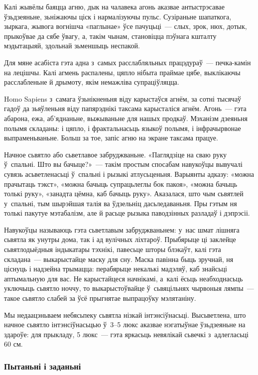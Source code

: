 Калі жывёлы баяцца агню, дык на чалавека агонь аказвае антыстрэсавае ўзьдзеяньне, зьніжаючы ціск і нармалізуючы пульс. Сузіраньне шапаткога, зыркага, жывога вогнішча «паглынае» ўсе пачуцьці~--- слых, зрок, нюх, дотык, прыкоўвае да сябе ўвагу, а, такім чынам, становіцца пэўнага кшталту мэдытацыяй, здольнай зьменшыць неспакой.

Для мяне асабіста гэта адна з~самых расслабляльных працэдураў~--- печка-камін на лецішчы. Калі агмень распалены, цяпло нібыта праймае цябе, выклікаючы расслабленьне й дрымоту, якім немажліва супраціўляцца.

Homo Sapiens з~самага ўзьнікненьня віду карыстаўся агнём, за сотні тысячаў гадоў да зьяўленьня віду папярэднікі таксама карысталіся агнём. Агонь~--- гэта абарона, ежа, аб'яднаньне, выжываньне для нашых продкаў. Мэханізм дзеяньня полымя складаны: і цяпло, і фрактальнасьць языкоў полымя, і інфрачырвонае выпраменьваньне. Больш за тое, запіс агню на экране таксама працуе.

Начное сьвятло або сьветлавое забруджваньне. «Паглядзіце на сваю руку ў~спальні. Што вы бачыце?»~--- такім простым спосабам навукоўцы вывучалі сувязь асьветленасьці ў~спальні і рызыкі атлусьценьня. Варыянты адказу: «можна прачытаць тэкст», «можна бачыць супрацьлеглы бок пакоя», «можна бачыць толькі руку», «занадта цёмна, каб бачыць руку». Аказалася, што чым сьвятлей у~спальні, тым шырэйшая талія ва ўдзельніц дасьледаваньня. Пры гэтым ня толькі пакутуе мэтабалізм, але й расьце рызыка паводзінных разладаў і дэпрэсіі.

Навукоўцы называюць гэта сьветлавым забруджваньнем: у~нас шмат лішняга сьвятла як унутры дома, так і ад вулічных ліхтароў. Прыбярыце ці заклейце сьвятлодыёдныя індыкатары тэхнікі, павесьце шторы блэкаўт, калі гэта складана~--- выкарыстайце маску для сну. Маска павінна быць зручнай, ня ціснуць і надзейна трымацца: перабярыце некалькі мадэляў, каб знайсьці аптымальную для вас. Не карыстайцеся начнікамі, а~калі ёсьць неабходнасьць уключыць сьвятло ноччу, то выкарыстоўвайце ў~сьвяцільнях чырвоныя лямпы~--- такое сьвятло слабей за ўсё прыгнятае выпрацоўку мэлятаніну.

Мы недаацэньваем небясьпеку сьвятла нізкай інтэнсіўнасьці. Высьветлена, што начное сьвятло інтэнсіўнасьцью ў~3--5 люкс аказвае нэгатыўнае ўзьдзеяньне на здароўе: для прыкладу, 5 люкс~--- гэта яркасьць невялікай сьвечкі з~адлегласьці 60 см.

\subsubsection{Пытаньні і заданьні}

